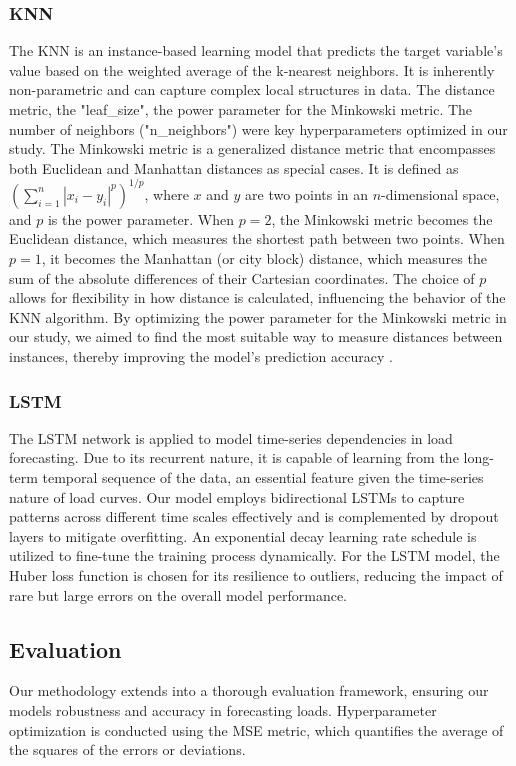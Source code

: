 \documentclass{article} %
\begin{document}
\subsubsection{KNN}
The \gls{KNN} is an instance-based learning model that predicts the target variable's value based on the weighted average of the k-nearest neighbors. It is inherently non-parametric and can capture complex local structures in data. The distance metric, the "leaf\_size", the power parameter for the Minkowski metric. The number of neighbors ("n\_neighbors") were key hyperparameters optimized in our study.  
The Minkowski metric is a generalized distance metric that encompasses both Euclidean and Manhattan distances as special cases. It is defined as $(\sum_{i=1}^{n} |x_i - y_i|^p)^{1/p}$, where $x$ and $y$ are two points in an $n$-dimensional space, and $p$ is the power parameter. When $p=2$, the Minkowski metric becomes the Euclidean distance, which measures the shortest path between two points. When $p=1$, it becomes the Manhattan (or city block) distance, which measures the sum of the absolute differences of their Cartesian coordinates. The choice of $p$ allows for flexibility in how distance is calculated, influencing the behavior of the KNN algorithm. By optimizing the power parameter for the Minkowski metric in our study, we aimed to find the most suitable way to measure distances between instances, thereby improving the model's prediction accuracy \cite{bishop2006pattern}.

\subsubsection{LSTM}
The \gls{LSTM} network is applied to model time-series dependencies in load forecasting. Due to its recurrent nature, it is capable of learning from the long-term temporal sequence of the data, an essential feature given the time-series nature of load curves. Our model employs bidirectional LSTMs to capture patterns across different time scales effectively and is complemented by dropout layers to mitigate overfitting. An exponential decay learning rate schedule is utilized to fine-tune the training process dynamically. 
For the \gls{LSTM} model, the Huber loss function is chosen for its resilience to outliers, reducing the impact of rare but large errors on the overall model performance. 

\subsection{Evaluation}
Our methodology extends into a thorough evaluation framework, ensuring our models robustness and accuracy in forecasting loads.
Hyperparameter optimization is conducted using the \gls{MSE} metric, which quantifies the average of the squares of the errors or deviations. 
\end{document}
